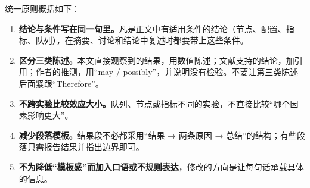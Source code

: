 \documentclass[11pt,a4paper]{ctexart}
\begin{document}
统一原则概括如下：
\begin{enumerate}[leftmargin=*]
\item \textbf{结论与条件写在同一句里。}凡是正文中有适用条件的结论（节点、配置、指标、队列），在摘要、讨论和结论中复述时都要带上这些条件。
\item \textbf{区分三类陈述。}本文直接观察到的结果，用数值陈述；文献支持的结论，加引用；作者的推测，用“may / possibly”，并说明没有检验。不要让第三类陈述后面紧跟“Therefore”。
\item \textbf{不跨实验比较效应大小。}队列、节点或指标不同的实验，不直接比较“哪个因素影响更大”。
\item \textbf{减少段落模板。}结果段不必都采用“结果 → 两条原因 → 总结”的结构；有些段落只需报告结果并指出边界即可。
\item \textbf{不为降低“模板感”而加入口语或不规则表达}，修改的方向是让每句话承载具体的信息。
\end{enumerate}
\end{document}
